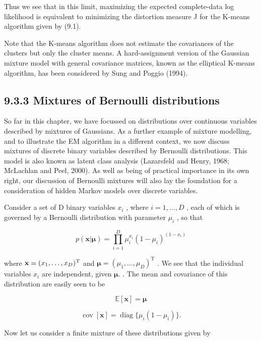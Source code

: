 \documentclass[
  10
]{article}
\begin{document}
Thus we see that in this limit, maximizing the expected complete-data
log likelihood is equivalent to minimizing the distortion measure J for
the K-means algorithm given by (9.1).

Note that the K-means algorithm does not estimate the covariances of the
clusters but only the cluster means. A hard-assignment version of the
Gaussian mixture model with general covariance matrices, known as the
elliptical K-means algorithm, has been considered by Sung and Poggio
(1994).

\subsection{9.3.3 Mixtures of Bernoulli
distributions}\label{mixtures-of-bernoulli-distributions}

So far in this chapter, we have focussed on distributions over
continuous variables described by mixtures of Gaussians. As a further
example of mixture modelling, and to illustrate the EM algorithm in a
different context, we now discuss mixtures of discrete binary variables
described by Bernoulli distributions. This model is also known as latent
class analysis (Lazarsfeld and Henry, 1968; McLachlan and Peel, 2000).
As well as being of practical importance in its own right, our
discussion of Bernoulli mixtures will also lay the foundation for a
consideration of hidden Markov models over discrete variables.

Consider a set of D binary variables \(x _ { i }\) , where
\(i = 1 , \ldots , D\) , each of which is governed by a Bernoulli
distribution with parameter \(\mu _ { i }\) , so that

\[
p (\mathbf {x} | \boldsymbol {\mu}) = \prod_ {i = 1} ^ {D} \mu_ {i} ^ {x _ {i}} (1 - \mu_ {i}) ^ {(1 - x _ {i})}\tag{9.44}
\]

where
\({ \bf x } = ( x _ { 1 } , \dots , x _ { D } ) ^ { \mathrm { T } }\)
and
\(\pmb { \mu } = ( \mu _ { 1 } , \ldots , \mu _ { D } ) ^ { \mathrm { T } }\)
. We see that the individual variables \(x _ { i }\) are independent,
given \(\pmb { \mu } .\) . The mean and covariance of this distribution
are easily seen to be

\[
\mathbb {E} [ \mathbf {x} ] = \boldsymbol {\mu}\tag{9.45}
\]

\[
\operatorname{cov} [ \mathbf {x} ] = \operatorname{diag} \{\mu_ {i} (1 - \mu_ {i}) \}.\tag{9.46}
\]

Now let us consider a finite mixture of these distributions given by
\end{document}
